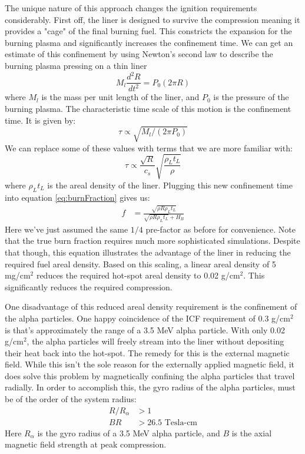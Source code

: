 The unique nature of this approach changes the ignition requirements considerably. First off, the liner is designed to survive the compression meaning it provides a "cage" of the final burning fuel. This constricts the expansion for the burning plasma and significantly increases the confinement time. We can get an estimate of this confinement by using Newton's second law to describe the burning plasma pressing on a thin liner 
%
\begin{equation}
	M_l\frac{d^2R}{dt^2} = P_0(2\pi R)
\end{equation}
%
where $M_l$ is the mass per unit length of the liner, and $P_0$ is the pressure of the burning plasma. The characteristic time scale of this motion is the confinement time. It is given by:
%
\begin{equation}
	\tau \propto \sqrt{M_l / (2\pi P_0)}
\end{equation}
%
We can replace some of these values with terms that we are more familiar with:
%
\begin{equation}
	\tau \propto \frac{\sqrt{R}}{c_s}\sqrt{\frac{\rho_Lt_L}{\rho}}
\end{equation}
%
where $\rho_Lt_L$ is the areal density of the liner. Plugging this new confinement time into equation \ref{eq:burnFraction} gives us:
%
\begin{equation}
	\begin{split}
		f &= \frac{\sqrt{\rho R \rho_Lt_L}}{\sqrt{\rho R \rho_Lt_L} + H_B}
	\end{split}
\end{equation}
%
Here we've just assumed the same $1/4$ pre-factor as before for convenience. Note that the true burn fraction requires much more sophisticated simulations. Despite that though, this equation illustrates the advantage of the liner in reducing the required fuel areal density. Based on this scaling, a linear areal density of 5 mg/cm$^2$ reduces the required hot-spot areal density to 0.02 g/cm$^2$. This significantly reduces the required compression.

One disadvantage of this reduced areal density requirement is the confinement of the alpha particles. One happy coincidence of the ICF requirement of 0.3 g/cm$^2$ is that's approximately the range of a 3.5 MeV alpha particle. With only 0.02 g/cm$^2$, the alpha particles will freely stream into the liner without depositing their heat back into the hot-spot. The remedy for this is the external magnetic field. While this isn't the sole reason for the externally applied magnetic field, it does solve this problem by magnetically confining the alpha particles that travel radially. In order to accomplish this, the gyro radius of the alpha particles, must be of the order of the system radius:
%
\begin{equation}
	\begin{split}			
		R / R_\alpha &> 1 \\
		BR &> 26.5 \text{ Tesla-cm}
	\end{split}
\end{equation}
%
Here $R_\alpha$ is the gyro radius of a 3.5 MeV alpha particle, and $B$ is the axial magnetic field strength at peak compression. 

